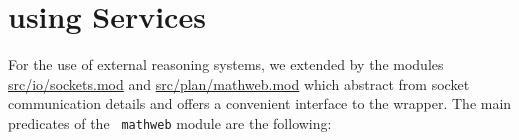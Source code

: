 

\section{{\lclam} using {\mathweb} Services}
\label{sec:mw-using-services}
For the use of external reasoning systems, we extended {\lclam} by the
modules \url{src/io/sockets.mod} and \url{src/plan/mathweb.mod} which
abstract from socket communication details and offers a convenient
interface to the {\mathwebsb} wrapper. The main predicates of the {\tt
  mathweb} module are the following:
